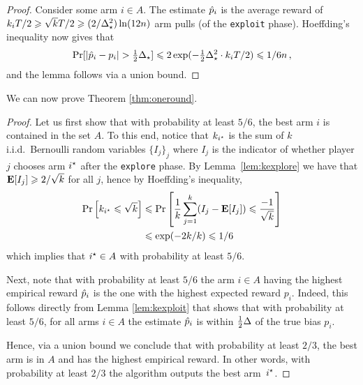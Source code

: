 \begin{proof}
Consider some arm $i \in A$. The estimate $\hat{p}_i$ is the average reward of 
$k_i T/2 \geqslant \sqrt{k} T/2 \geqslant (2/\Delta_{\star}^2) \ln(12n)$
arm pulls (of the \texttt{exploit} phase).
Hoeffding's inequality now gives that
\begin{align*}
	\Pr[|\hat{p}_i - p_i| > \tfrac{1}{2} \Delta_{\star}]
	\leqslant 2 \exp (-\tfrac{1}{2} \Delta_{\star}^2 \cdot k_i T/2)
	\leqslant 1/6n \,,
\end{align*}
and the lemma follows via a union bound.
\end{proof}




We can now prove Theorem \ref{thm:oneround}.

\begin{proof}
Let us first show that with probability at least $5/6$, the best arm $i$ is contained in the set $A$.
To this end, notice that $k_{i^\star}$ is the sum of $k$ i.i.d.~Bernoulli random variables $\{I_j\}_{j}$ where $I_j$ is the indicator of whether player $j$ chooses arm $i^\star$ after the \texttt{explore} phase. By Lemma~\ref{lem:kexplore} we have that $\mathbf{E}[I_j] \geqslant 2/\sqrt{k}$ for all $j$, hence by Hoeffding's inequality,
\begin{align*}
	\Pr\left[k_{i^\star} \leqslant \sqrt{k}\right] 
	&\leqslant \Pr\left[ \frac{1}{k}\sum_{j=1}^k (I_j - \mathbf{E}[I_j]) \leqslant \frac{-1}{\sqrt{k}} \right] \\
	&\leqslant \exp(-2k/k) \leqslant 1/6
\end{align*}
which implies that $i^\star \in A$ with probability at least $5/6$.


Next, note that with probability at least $5/6$ the arm $i \in A$ having the highest empirical reward $\hat{p}_i$ is the one with the highest expected reward $p_i$.
Indeed, this follows directly from Lemma \ref{lem:kexploit} that shows that with probability at least $5/6$, for all arms $i \in A$ the estimate $\hat{p}_i$ is within $\frac{1}{2}\Delta$ of the true bias $p_i$.

Hence, via a union bound we conclude that with probability at least $2/3$, the best arm is in $A$ and has the highest empirical reward. 
In other words, with probability at least $2/3$ the algorithm outputs the best arm~$i^\star$.
\end{proof}








